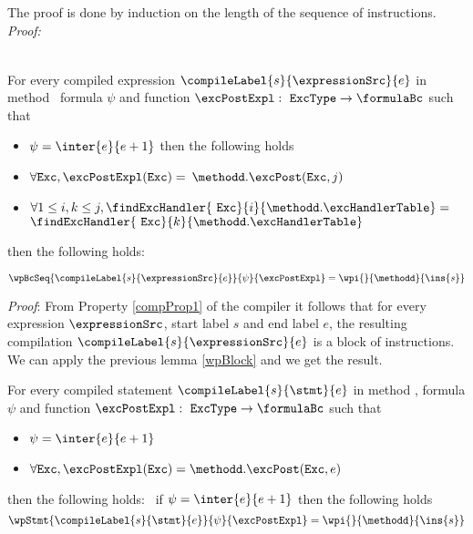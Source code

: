 The proof is done by induction on the length of the sequence of instructions.
\textit{Proof:}

$$
\begin{array}{l}
\end{array}
$$

\begin{relWpExpr}\label{relWpExpr}
     For every compiled expression $\compileLabel{s}{\expressionSrc}{e}$  in  method \methodd  \,  formula $\psi$ and function $\excPostExpl : \mbox{ \rm \texttt{ExcType}}  \rightarrow \formulaBc $ such that 

      \begin{itemize}
            \item $\psi = \inter{e}{e+1}$ then the following holds
	    \item $\forall \mbox{\rm\texttt{Exc}} ,  \excPostExpl( \mbox{\rm\texttt{Exc}} ) =$ 
                  $ \methodd.\excPost(\mbox{\rm\texttt{Exc}}, j ) $ 
             \item   $ \forall 1 \le i,k \le j, \findExcHandler{\mbox{ \rm \texttt{Exc}} }{i}{\methodd.\excHandlerTable} = $ \\
                     $ \findExcHandler{\mbox{ \rm \texttt{Exc}} }{k}{\methodd.\excHandlerTable}   $

      \end{itemize} then the following holds:

     $$   \wpBcSeq{\compileLabel{s}{\expressionSrc}{e}   }{\psi }{\excPostExpl} = \wpi{}{\methodd}{\ins{s}}$$        

\end{relWpExpr}

\textit{Proof}: From Property \ref{compProp1} of the compiler it follows that for every expression
 $\expressionSrc$, start label $s$  and  end label $e$,
  the resulting compilation   $\compileLabel{s}{\expressionSrc}{e}$ is a block of instructions. We can apply 
 the previous lemma  \ref{wpBlock} and we get the result.


\begin{relWpStmt}\label{relWpStmt}
     For every compiled statement $\compileLabel{s}{\stmt}{e}$  in  method \methodd, formula $\psi$ and 
    function $\excPostExpl : \mbox{ \rm \texttt{ExcType}}  \rightarrow \formulaBc $ such that 

      \begin{itemize}
            \item $\psi = \inter{e}{e+1}$
	    \item $\forall \mbox{\rm\texttt{Exc}} ,  \excPostExpl( \mbox{\rm\texttt{Exc}} ) = \methodd.\excPost(\mbox{\rm\texttt{Exc}}, e ) $ 
      \end{itemize} then the following holds: \
     if $\psi = \inter{e}{e+1}$ then the following holds
     $$   \wpStmt{\compileLabel{s}{\stmt}{e} }{\psi }{\excPostExpl} = \wpi{}{\methodd}{\ins{s}}$$   
\end{relWpStmt}
